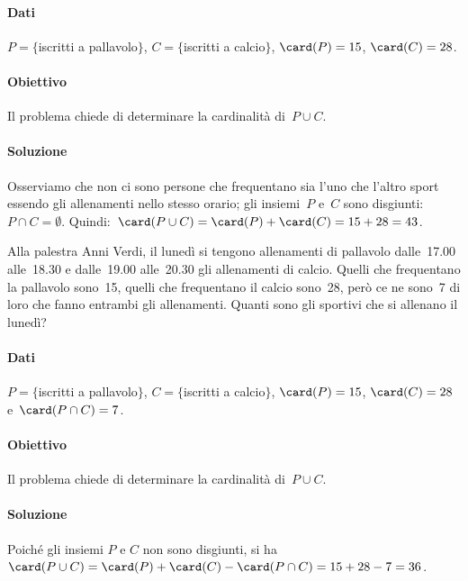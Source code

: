 \begin{exrig}
\begin{esempio}
\paragraph{Dati} $P=\{$iscritti a pallavolo$\}$, $C=\{$iscritti a calcio$\}$, $\card(P)=15$, $\card(C)=28$.
\paragraph{Obiettivo} Il problema chiede di determinare la cardinalità di~$P\cup C$.
\paragraph{Soluzione} Osserviamo che non ci sono persone che frequentano sia
l'uno che l'altro sport essendo gli allenamenti nello stesso orario; gli insiemi~$P$ e~$C$
sono disgiunti:~$P\cap C=\emptyset $. Quindi:~$\card(P\cup C)=\card(P)+\card(C)=15+28=43$.

% 
\end{esempio}

\begin{esempio}
\begin{multicols}{2}
 Alla palestra Anni Verdi, il lunedì si tengono allenamenti di pallavolo dalle~17.00 alle~18.30 e dalle~19.00 alle~20.30 gli
allenamenti di calcio. Quelli che frequentano la pallavolo sono~15, quelli che frequentano il calcio sono~28, però ce ne sono~7 di loro
che fanno entrambi gli allenamenti. Quanti sono gli sportivi che si allenano il lunedì?
\begin{center}
 
 \end{center}
\end{multicols}
\paragraph{Dati} $P=\{$iscritti a pallavolo$\}$, $C=\{$iscritti a calcio$\}$, $\card(P)=15$, $\card(C)=28$ e~$\card(P\cap C)=7$.\paragraph{Obiettivo} Il problema chiede di determinare la cardinalità di~$P\cup C$.
\paragraph{Soluzione} Poiché gli insiemi $P$ e $C$ non sono disgiunti, si ha $\card(P\cup C)=\card(P)+\card(C)-\card(P\cap C)=15+28-7=36$.


\end{esempio}
\end{exrig}
